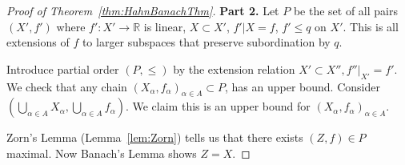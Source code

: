 \begin{proof}[Proof of Theorem~\ref{thm:HahnBanachThm}]
	\textbf{Part 2.} Let $P$ be the set of all pairs $(X', f')$ where $f': X' \to \mathbb{R}$ is linear, $X \subset X'$, $f'|X = f$, $f' \le q$ on $X'$. This is all extensions of $f$ to larger subspaces that preserve subordination by $q$. 

	Introduce partial order $(P, \le )$ by the extension relation $X ' \subset X'', f''|_{X'} = f'$. We check that any chain $\left( X_\alpha, f_\alpha \right) _{\alpha \in A} \subset P$, has an upper bound. Consider $\left( \bigcup_{\alpha \in A} X_\alpha, \bigcup_{\alpha \in A} f_\alpha \right) $. We claim this is an upper bound for $\left( X_\alpha, f_\alpha \right) _{\alpha \in A}$.

	Zorn's Lemma (Lemma~\ref{lem:Zorn}) tells us that there exists $(Z, f) \in P$ maximal. Now Banach's Lemma shows $Z = X$.
\end{proof}

